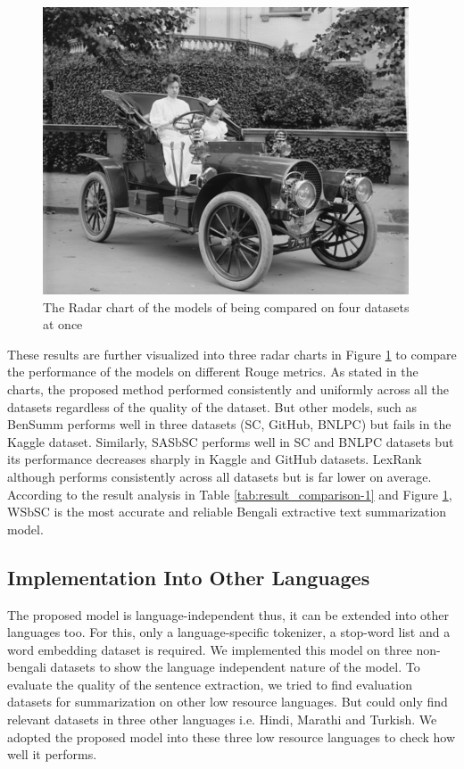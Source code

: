 \documentclass[acmlarge]{acmart}
\begin{document}
\begin{figure}[]
	\centering
	\includegraphics{sample-franklin}
	\caption{The Radar chart of the models of being compared on four datasets at once}
	\label{fig:radarchart}
\end{figure}
These results are further visualized into three radar charts in Figure \ref{fig:radarchart} to compare the performance of the models on different Rouge metrics. As stated in the charts, the proposed method performed consistently and uniformly across all the datasets regardless of the quality of the dataset. But other models, such as BenSumm performs well in three datasets (SC, GitHub, BNLPC) but fails in the Kaggle dataset. Similarly, SASbSC performs well in SC and BNLPC datasets but its performance decreases sharply in Kaggle and GitHub datasets. LexRank although performs consistently across all datasets but is far lower on average. According to the result analysis in Table \ref{tab:result_comparison-1} and Figure \ref{fig:radarchart}, WSbSC is the most accurate and reliable Bengali extractive text summarization model.

\subsection{Implementation Into Other Languages}\label{subsec:implementation-into-other-languages}
The proposed model is language-independent thus, it can be extended into other languages too. For this, only a language-specific tokenizer, a stop-word list and a word embedding dataset is required. We implemented this model on three non-bengali datasets to show the language independent nature of the model. To evaluate the quality of the sentence extraction, we tried to find evaluation datasets for summarization on other low resource languages. But could only find relevant datasets in three other languages i.e. Hindi, Marathi and Turkish. We adopted the proposed model into these three low resource languages to check how well it performs.\\
\end{document}
